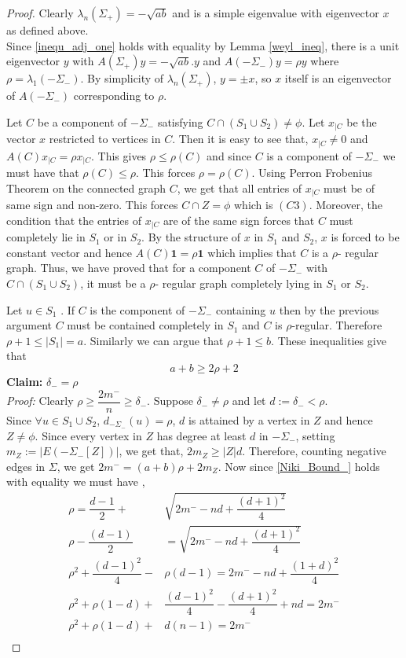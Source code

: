\documentclass[12pt]{article}
\theoremstyle{plain}
\numberwithin{equation}{section}
\begin{document}
\begin{proof}
		Clearly $\lambda_n(\Sigma_+) = -\sqrt{ab}$ and is a simple eigenvalue with eigenvector $x$ as defined above.\\
		Since \eqref{inequ_adj_one} holds with equality by Lemma \ref{weyl_ineq}, there is a unit eigenvector $y$ with $A(\Sigma_+) y =-\sqrt{ab}. y$ and $A(-\Sigma_-)y = \rho y$ where $\rho=\lambda_1(-\Sigma_-)$. By simplicity of $\lambda_n(\Sigma_+)$, $y =\pm x$, so $x$ itself is an eigenvector of $A(-\Sigma_-)$ corresponding to $\rho$.
		
		Let $C$ be a component of $-\Sigma_-$ satisfying $C\cap(S_1 \cup S_2) \neq \phi$. Let $x_{|C}$ be the vector $x$ restricted to vertices in $C$. Then it is easy to see that, $x_{|C} \neq 0$ and $A(C) x_{|C}= \rho x_{|C} $. This gives $\rho \leq \rho(C)$ and since $C$ is a component of $-\Sigma_-$ we must have that $\rho(C) \leq \rho$. This forces $\rho= \rho(C)$. Using Perron Frobenius Theorem on the connected graph $C$, we get that all entries of $x_{|C}$ must be of same sign and non-zero. This forces $C \cap Z = \phi$ which is $(C3)$. Moreover, the condition that the entries of $x_{|C}$ are of the same sign forces that $C$ must completely lie in $S_1$ or in $S_2$. By the structure of $x$ in $S_1$ and $S_2$, $x$ is forced to be constant vector and hence $A(C) \mathbf{1}=\rho \mathbf{1}$ which implies that $C$ is a $\rho$- regular graph. Thus, we have proved that for a component $C$ of $-\Sigma_-$ with $C \cap (S_1 \cup S_2)$, it must be a $\rho$- regular graph completely lying in $S_1$ or $S_2$.
		
		Let $u \in S_1$ . If $C$ is the component of $-\Sigma_-$ containing $u$ then by the previous argument $C$ must be contained completely in $S_1$ and $C$ is $\rho$-regular. Therefore $\rho+1 \leq \vert S_1 \vert =a$. Similarly we can argue that $\rho+1 \leq b$. These inequalities give that 
		\begin{equation}\label{contradic}
			a+b \geq 2\rho+2
		\end{equation}
		\textbf{Claim:} $\delta_-= \rho$ \\
		\textit{Proof:} Clearly $\rho \geq \dfrac{2m^-}{n} \geq \delta_-$. Suppose $\delta_- \neq \rho$ and let $d:= \delta_-<\rho.$\\
		Since $\forall u \in S_1 \cup S_2$, $d_{-\Sigma_-}(u) =\rho$, $d$ is attained by a vertex in $Z$ and hence $Z \neq \phi$. Since every vertex in $Z$ has degree at least $d$ in $-\Sigma_-$, setting $m_Z:= \vert E(-\Sigma_-[Z])\vert$, we get that, $2m_Z\geq \vert Z \vert d$. Therefore, counting negative edges in $\Sigma$, we get $2m^-=(a+b)\rho+2m_Z$. Now since \eqref{Niki_Bound_} holds with equality we must have , 
		\begin{align*}
			\rho = \dfrac{d-1}{2}+ &\sqrt{2m^{-}-nd +\dfrac{(d+1)^2}{4}}\\
			\rho-\dfrac{(d-1)}{2}&=\sqrt{2m^--nd +\dfrac{(d+1)^2}{4}}\\
			\rho^2+\dfrac{(d-1)^2}{4}-&\rho(d-1)= 2m^--nd+\dfrac{(1+d)^2}{4}\\
			\rho^2+\rho(1-d)+&\dfrac{(d-1)^2}{4}-\dfrac{(d+1)^2}{4}+nd=2m^-\\
			\rho^2+\rho(1-d)+&d(n-1)=2m^- \\
		\end{align*}
		

\end{proof}
\end{document}
